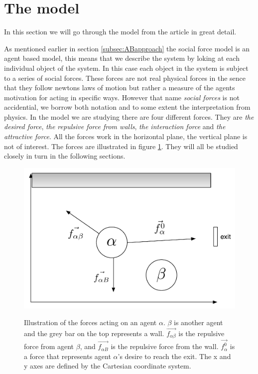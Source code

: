 \section{The model}
\label{sec:the-model}
In this section we will go through the model from the article \cite{self-org} in 
great detail. 
 
As mentioned earlier in section \ref{subsec:ABapproach} the social force model is an
agent based model, this means that we describe the system by loking at each individual 
object of the system. In this case each object in the system is subject to a series of 
social forces. These forces are not real physical forces in the sence that they follow 
newtons laws of motion but rather a measure of the agents motivation for acting in 
specific ways. However that name \emph{social forces} is not accidential, we borrow both 
notation and to some extent the interpretation from physics. In the model we are studying 
there are four different forces. They are \emph{the desired force}, \emph{the repulsive 
force from walls}, \emph{the interaction force} and \emph{the attractive force}. All the 
forces work in the horizontal plane, the vertical plane is not of interest. The forces 
are illustrated in figure \ref{ForceModel}.  They will all be studied closely in turn in 
the following sections.

\begin{figure}[hb]
    \centering
    {\includegraphics[scale=0.45]{Figures/ForceModel.pdf}} 
    \caption[Notation of forces acting on an agent]{Illustration of the forces acting on an agent $\alpha $. $ \beta $ is another agent and the grey bar on the top represents a wall. $ \vec{f_{\alpha\beta}} $ is the repulsive force from agent $ \beta $, and $ \vec{f_{\alpha B}} $ is the repulsive force from the wall. $ \vec{f^{0}_{\alpha}} $ is a force that represents agent $ \alpha $'s desire to reach the exit.
    The x and y axes are defined by the Cartesian coordinate system.}
    \label{ForceModel}
\end{figure}

